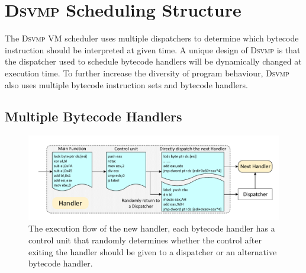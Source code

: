 \documentclass[preprint,12pt,3p]{elsarticle}
\newcommand{\DSVMP}{\textsc{Dsvmp}\xspace}
\begin{document}










\section{\DSVMP Scheduling Structure}\label{sec:dvs}

The \DSVMP VM scheduler uses multiple dispatchers to determine which bytecode instruction should be interpreted at given time.
A unique design of \DSVMP is that the dispatcher used to schedule bytecode handlers will be dynamically changed at execution time. To further increase the diversity of program behaviour, \DSVMP also uses multiple bytecode instruction sets and bytecode handlers.

\subsection{Multiple Bytecode Handlers}\label{sec:mb}

\begin{figure}[!t]
  \centering
  \includegraphics[width=0.9\columnwidth]{figure/fighandler.pdf}
  \caption{The execution flow of the new handler, each bytecode handler has a control unit that randomly determines whether the control after exiting the handler should be given to a dispatcher or an alternative bytecode handler.}\label{fig:newhandler}
\end{figure}
\end{document}
